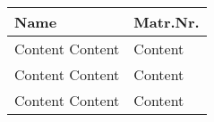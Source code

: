 \documentclass[a4paper, 11pt]{article}
\begin{document}
\begin{table}[h!]
    \begin{tabular}{@{}l | l }
         \hline
         Name & Matr.Nr. \\ [0ex]
         \hline
         Content Content & Content \\
         Content Content & Content \\
         Content Content & Content \\
         \hline
    \end{tabular}
    \label{tab:my_label}
\end{table}
\end{document}
